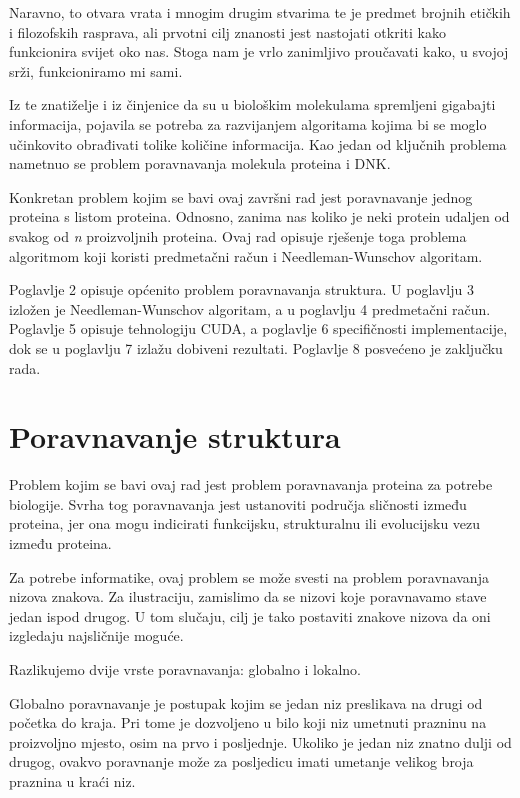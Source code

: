 \documentclass[times, utf8, zavrsni]{fer}
\begin{document}
Naravno, to otvara vrata i mnogim drugim stvarima te je predmet brojnih etičkih i filozofskih rasprava, ali prvotni cilj znanosti jest nastojati otkriti kako funkcionira svijet oko nas. Stoga nam je vrlo zanimljivo proučavati kako, u svojoj srži, funkcioniramo mi sami.

Iz te znatiželje i iz činjenice da su u biološkim molekulama spremljeni gigabajti informacija, pojavila se potreba za razvijanjem algoritama kojima bi se moglo učinkovito obrađivati tolike količine informacija. Kao jedan od ključnih problema nametnuo se problem poravnavanja molekula proteina i DNK.

Konkretan problem kojim se bavi ovaj završni rad jest poravnavanje jednog proteina s listom proteina. Odnosno, zanima nas koliko je neki protein udaljen od svakog od \textit{n} proizvoljnih proteina. Ovaj rad opisuje rješenje toga problema algoritmom koji koristi predmetačni račun i Needleman-Wunschov algoritam.

Poglavlje 2 opisuje općenito problem poravnavanja struktura. U poglavlju 3 izložen je Needleman-Wunschov algoritam, a u poglavlju 4 predmetačni račun.
Poglavlje 5 opisuje tehnologiju CUDA, a poglavlje 6 specifičnosti implementacije, dok se u poglavlju 7 izlažu dobiveni rezultati. Poglavlje 8 posvećeno je zaključku rada.


\chapter{Poravnavanje struktura}
\indent

Problem kojim se bavi ovaj rad jest problem poravnavanja proteina za potrebe biologije. Svrha tog poravnavanja jest ustanoviti područja sličnosti između proteina, jer ona mogu indicirati funkcijsku, strukturalnu ili evolucijsku vezu između proteina.

Za potrebe informatike, ovaj problem se može svesti na problem poravnavanja nizova znakova. Za ilustraciju, zamislimo da se nizovi koje poravnavamo stave jedan ispod drugog. U tom slučaju, cilj je tako postaviti znakove nizova da oni izgledaju najsličnije moguće.

Razlikujemo dvije vrste poravnavanja: globalno i lokalno.

Globalno poravnavanje je postupak kojim se jedan niz preslikava na drugi od početka do kraja. Pri tome je dozvoljeno u bilo koji niz umetnuti prazninu na proizvoljno mjesto, osim na prvo i posljednje. Ukoliko je jedan niz znatno dulji od drugog, ovakvo poravnanje može za posljedicu imati umetanje velikog broja praznina u kraći niz.
\end{document}
